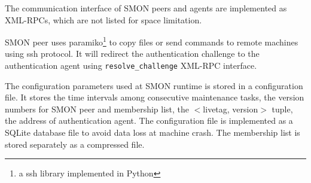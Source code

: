 The communication interface of SMON peers and agents are
implemented as XML-RPCs, which are not listed for space
limitation.

SMON peer uses paramiko\footnote{a ssh library implemented
in Python} to copy files or send commands to remote machines
using ssh protocol. It will redirect the authentication
challenge to the authentication agent using
\texttt{resolve\_challenge} XML-RPC interface.

The configuration parameters used at SMON runtime is stored
in a configuration file. It stores the time intervals among
consecutive maintenance tasks, the version numbers for SMON
peer and membership list, the $<$livetag, version$>$ tuple,
the address of authentication agent. The configuration file
is implemented as a SQLite database file to avoid data loss
at machine crash. The membership list is stored separately
as a compressed file.



